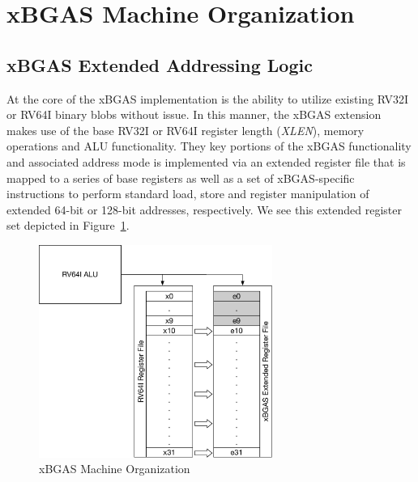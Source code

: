 \documentclass{article}
\begin{document}
\clearpage
\section{xBGAS Machine Organization}

\subsection{xBGAS Extended Addressing Logic}

At the core of the xBGAS implementation is the ability to utilize existing RV32I or RV64I 
binary blobs without issue.  In this manner, the xBGAS extension makes use 
of the base RV32I or RV64I register length (\textit{XLEN}), memory operations and ALU functionality.  
They key portions of the xBGAS functionality and associated address mode 
is implemented via an extended register file that is mapped to a series 
of base registers as well as a set of xBGAS-specific instructions to perform 
standard load, store and register manipulation of extended 64-bit or 128-bit addresses, respectively.  We 
see this extended register set depicted in Figure~\ref{fig:machineorganization}.  

\begin{figure}[h!]
\begin{center}
\includegraphics[width=3in]{figures/rv128imachorg.pdf}
\caption{xBGAS Machine Organization}
\label{fig:machineorganization}
\end{center}
\end{figure}
\end{document}
